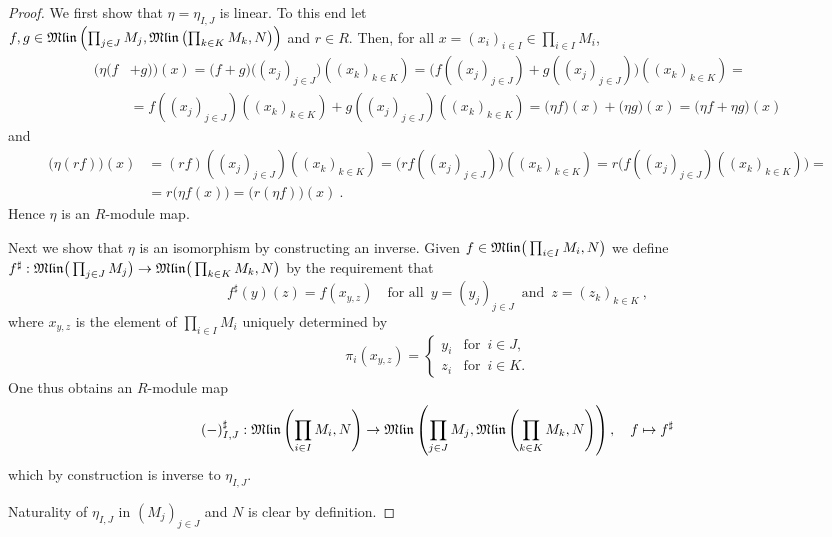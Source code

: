 \begin{proof}
  
  We first show that $\eta= \eta_{I,J} $ is linear. To this end let\\
  $f,g \in \mathfrak{Mlin} \left( \prod_{j\in J} M_j , \mathfrak{Mlin} \left(\prod_{k\in K} M_k ,N \right)\right)$ and $r\in R$.
  Then, for all $x = (x_i)_{i\in I} \in \prod_{i\in I} M_i$,
  \begin{equation*}
  \begin{split}
    \big( \eta (f & +g)\big) (x)  = \big(f+g\big) \big( (x_j)_{j\in J} \big)\left( (x_k)_{k\in K} \right)
    = \big( f((x_j)_{j\in J}) + g ((x_j)_{j\in J})\big) \left( (x_k)_{k\in K} \right) = \\
    & = f((x_j)_{j\in J})  \left( (x_k)_{k\in K} \right) +  g ((x_j)_{j\in J}) \left( (x_k)_{k\in K} \right) =
     \big( \eta f \big) (x) + \big( \eta g \big) (x) =  \big( \eta f + \eta g \big) (x) 
  \end{split}
  \end{equation*}
  and
  \begin{equation*}
  \begin{split}
    \big( \eta (rf)\big) (x) & = (rf) ((x_j)_{j\in J})  \left( (x_k)_{k\in K} \right) =
    \big( r f((x_j)_{j\in J})\big) \left( (x_k)_{k\in K} \right) =
    r \big( f((x_j)_{j\in J})\left( (x_k)_{k\in K} \right)\big) = \\
    & = r \big( \eta f (x)\big) =  \big( r (\eta f ) \big) (x) \ .
  \end{split}
  \end{equation*}
  Hence $\eta$ is an $R$-module map.

  Next we show that $\eta$ is an isomorphism by constructing an inverse.
  Given $f \in \mathfrak{Mlin} \big( \prod_{i\in I} M_i, N \big)$ we define
  $f^\sharp : \mathfrak{Mlin} \big( \prod_{j\in J} M_j \big) \to \mathfrak{Mlin} \big(\prod_{k\in K} M_k ,N \big)$ by the requirement that 
  \[
      f^\sharp (y) (z) = f (x_{y,z}) \quad \text{for all}\enspace y = (y_j)_{j\in J}\enspace \text{and} \enspace z = (z_k)_{k \in K} \ ,
  \]
  where $x_{y,z}$ is the  element of $\prod_{i\in I}M_i$ uniquely determined by
  \[
    \pi_i (x_{y,z}) =
    \begin{cases}
      y_i & \text{for}\enspace i \in J , \\
      z_i & \text{for}\enspace i \in K .   
    \end{cases}
  \] 
  One thus obtains an $R$-module map 
  \[
    (-)^\sharp_{I,J} :
    \mathfrak{Mlin} \left( \prod_{i\in I} M_i, N \right) \to
    \mathfrak{Mlin} \left( \prod_{j\in J} M_j , \mathfrak{Mlin} \left(\prod_{k\in K} M_k ,N \right)\right),\quad f \mapsto f^\sharp
  \]
  which by construction is inverse to $\eta_{I,J}$. 

  Naturality of $\eta_{I,J}$ in $(M_j)_{j\in J}$ and $N$ is clear by definition. 
\end{proof}

